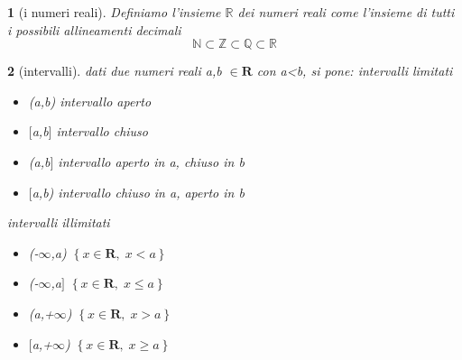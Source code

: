 \documentclass{book}
\theoremstyle{mystyle}
\newtheorem*{mydefinition}{}
\begin{document}
\begin{mydefinition}[i numeri reali]
    Definiamo l'insieme $\mathds{R}$ dei numeri reali come l'insieme di tutti i possibili allineamenti decimali
    $$\mathds{N}\subset\mathds{Z}\subset\mathds{Q}\subset\mathds{R}$$
\end{mydefinition}

 \begin{mydefinition}[intervalli]
     dati due numeri reali a,b $\in\mathbf{R}$ con a<b, si pone: \newline
     \textit{intervalli limitati}
     \begin{itemize} 
         \item (a,b) \hspace{3cm} intervallo \emph{aperto}
         \item $[$a,b$]$ \hspace{3cm} intervallo \emph{chiuso}
         \item (a,b$]$ \hspace{3cm} intervallo \emph{aperto in a, chiuso in b}
         \item $[$a,b) \hspace{3cm} intervallo \emph{chiuso in a, aperto in b}
     \end{itemize}
 \textit{intervalli illimitati}
     \begin{itemize} 
         \item (-$\infty$,a) \hspace{3cm} $\left \{ x\in \mathbf{R}, \; x<a\right \}$
         \item (-$\infty$,a$]$ \hspace{3cm} $\left \{ x\in \mathbf{R}, \; x\leq a\right \}$
         \item (a,+$\infty$) \hspace{2.87cm} $\left \{ x\in \mathbf{R}, \; x>a\right \}$
         \item $[$a,+$\infty$) \hspace{3cm} $\left \{ x\in \mathbf{R}, \; x\geq a\right \}$
     \end{itemize}
 
 \end{mydefinition}
\vspace{1cm}
\end{document}
